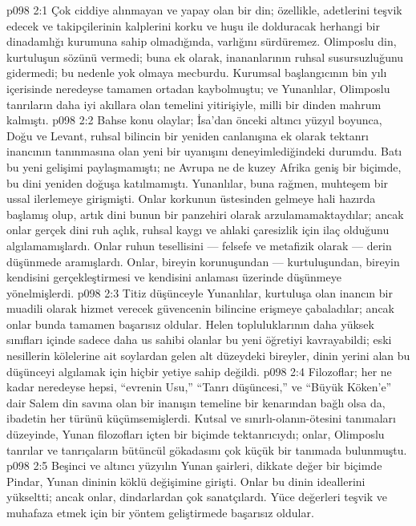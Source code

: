 \vs p098 2:1 Çok ciddiye alınmayan ve yapay olan bir din; özellikle, adetlerini teşvik edecek ve takipçilerinin kalplerini korku ve huşu ile dolduracak herhangi bir dinadamlığı kurumuna sahip olmadığında, varlığını sürdüremez. Olimposlu din, kurtuluşun sözünü vermedi; buna ek olarak, inananlarının ruhsal susursuzluğunu gidermedi; bu nedenle yok olmaya mecburdu. Kurumsal başlangıcının bin yılı içerisinde neredeyse tamamen ortadan kaybolmuştu; ve Yunanlılar, Olimposlu tanrıların daha iyi akıllara olan temelini yitirişiyle, milli bir dinden mahrum kalmıştı.
\vs p098 2:2 Bahse konu olaylar; İsa’dan önceki altıncı yüzyıl boyunca, Doğu ve Levant, ruhsal bilincin bir yeniden canlanışına ek olarak tektanrı inancının tanınmasına olan yeni bir uyanışını deneyimlediğindeki durumdu. Batı bu yeni gelişimi paylaşmamıştı; ne Avrupa ne de kuzey Afrika geniş bir biçimde, bu dini yeniden doğuşa katılmamıştı. Yunanlılar, buna rağmen, muhteşem bir ussal ilerlemeye girişmişti. Onlar korkunun üstesinden gelmeye hali hazırda başlamış olup, artık dini bunun bir panzehiri olarak arzulamamaktaydılar; ancak onlar gerçek dini ruh açlık, ruhsal kaygı ve ahlaki çaresizlik için ilaç olduğunu algılamamışlardı. Onlar ruhun tesellisini --- felsefe ve metafizik olarak --- derin düşünmede aramışlardı. Onlar, bireyin korunuşundan --- kurtuluşundan, bireyin kendisini gerçekleştirmesi ve kendisini anlaması üzerinde düşünmeye yönelmişlerdi.
\vs p098 2:3 Titiz düşünceyle Yunanlılar, kurtuluşa olan inancın bir muadili olarak hizmet verecek güvencenin bilincine erişmeye çabaladılar; ancak onlar bunda tamamen başarısız oldular. Helen topluluklarının daha yüksek sınıfları içinde sadece daha us sahibi olanlar bu yeni öğretiyi kavrayabildi; eski nesillerin kölelerine ait soylardan gelen alt düzeydeki bireyler, dinin yerini alan bu düşünceyi algılamak için hiçbir yetiye sahip değildi.
\vs p098 2:4 Filozoflar; her ne kadar neredeyse hepsi, “evrenin Usu,” “Tanrı düşüncesi,” ve “Büyük Köken’e” dair Salem din savına olan bir inanışın temeline bir kenarından bağlı olsa da, ibadetin her türünü küçümsemişlerdi. Kutsal ve sınırlı\hyp{}olanın\hyp{}ötesini tanımaları düzeyinde, Yunan filozofları içten bir biçimde tektanrıcıydı; onlar, Olimposlu tanrılar ve tanrıçaların bütüncül gökadasını çok küçük bir tanımada bulunmuştu.
\vs p098 2:5 Beşinci ve altıncı yüzyılın Yunan şairleri, dikkate değer bir biçimde Pindar, Yunan dininin köklü değişimine girişti. Onlar bu dinin ideallerini yükseltti; ancak onlar, dindarlardan çok sanatçılardı. Yüce değerleri teşvik ve muhafaza etmek için bir yöntem geliştirmede başarısız oldular.

